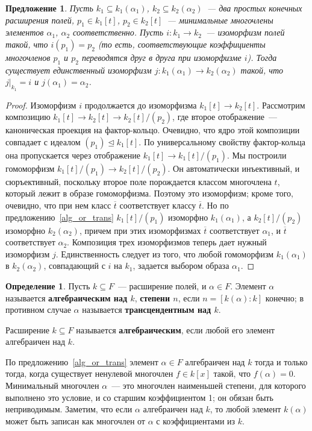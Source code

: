 \documentclass[a4paper,11pt]{scrartcl}
\theoremstyle{plain}
\newtheorem{proposition}[theorem]{Предложение}
\theoremstyle{definition}
\newtheorem{definition}[theorem]{Определение}
\newcommand\dfn[1]{\textbf{#1}}
\newcommand\trleq{\trianglelefteq}
\newcommand\sseq{\subseteq}
\begin{document}
\begin{proposition}\label{proposition_extending_isomorphism}
Пусть $k_1\sseq k_1(\alpha_1)$, $k_2\sseq k_2(\alpha_2)$~--- два
простых конечных
расширения полей, $p_1\in k_1[t]$, $p_2\in k_2[t]$~--- минимальные
многочлены элементов $\alpha_1$, $\alpha_2$ соответственно.
Пусть $i\colon k_1\to k_2$~--- изоморфизм полей такой, что
$i(p_1)=p_2$ (то есть, соответствующие коэффициенты многочленов $p_1$
и $p_2$ переводятся друг в друга при изоморфизме $i$). Тогда
существует единственный изоморфизм $j\colon k_1(\alpha_1)\to k_2
(\alpha_2)$
такой, что $j|_{k_1}=i$ и $j(\alpha_1)=\alpha_2$.
\end{proposition}
\begin{proof}
Изоморфизм $i$ продолжается до изоморфизма $k_1[t]\to
k_2[t]$. Рассмотрим композицию $k_1[t]\to k_2[t]\to k_2[t]/(p_2)$, где
второе отображение~--- каноническая проекция на
фактор-кольцо. Очевидно, что ядро этой композиции совпадает с идеалом
$(p_1)\trleq k_1[t]$. По универсальному свойству фактор-кольца она
пропускается через отображение $k_1[t]\to k_1[t]/(p_1)$. Мы построили
гомоморфизм $k_1[t]/(p_1)\to k_2[t]/(p_2)$. Он автоматически
инъективный, и сюръективный, поскольку второе поле порождается классом
многочлена $t$, который лежит в образе гомоморфизма. Поэтому это
изоморфизм; кроме того, очевидно, что при нем класс $\overline{t}$
соответствует классу $\overline{t}$.
Но по предложению~\ref{alg_or_trans} $k_1[t]/(p_1)$
изоморфно $k_1(\alpha_1)$, а $k_2[t]/(p_2)$ изоморфно $k_2(\alpha_2)$,
причем
при этих изоморфизмах $\overline{t}$ соответствует $\alpha_1$, и
$\overline{t}$ соответствует $\alpha_2$. Композиция трех изоморфизмов
теперь дает нужный изоморфизм $j$. Единственность следует из того, что
любой гомоморфизм $k_1(\alpha_1)$ в $k_2(\alpha_2)$, совпадающий с $i$
на $k_1$, задается выбором образа $\alpha_1$.
\end{proof}

\begin{definition}
Пусть $k\sseq F$~--- расширение полей, и $\alpha\in F$. Элемент
$\alpha$
называется \dfn{алгебраическим над $k$}, \dfn{степени $n$}, если
$n=[k(\alpha):k]$ конечно; в противном случае $\alpha$ называется
\dfn{трансцендентным над $k$}.

Расширение $k\sseq F$ называется \dfn{алгебраическим}, если любой его
элемент алгебраичен над $k$.
\end{definition}

По предложению~\ref{alg_or_trans} элемент $\alpha\in F$ алгебраичен
над
$k$ тогда и только тогда, когда существует ненулевой многочлен $f\in
k[x]$ такой, что $f(\alpha)=0$. Минимальный многочлен $\alpha$~--- это
многочлен наименьшей степени, для которого выполнено это условие, и со
старшим коэффициентом 1; он обязан быть неприводимым. Заметим, что
если $\alpha$ алгебраичен над $k$, то любой элемент $k(\alpha)$ может
быть
записан как многочлен от $\alpha$ с коэффициентами из $k$.
\end{document}

